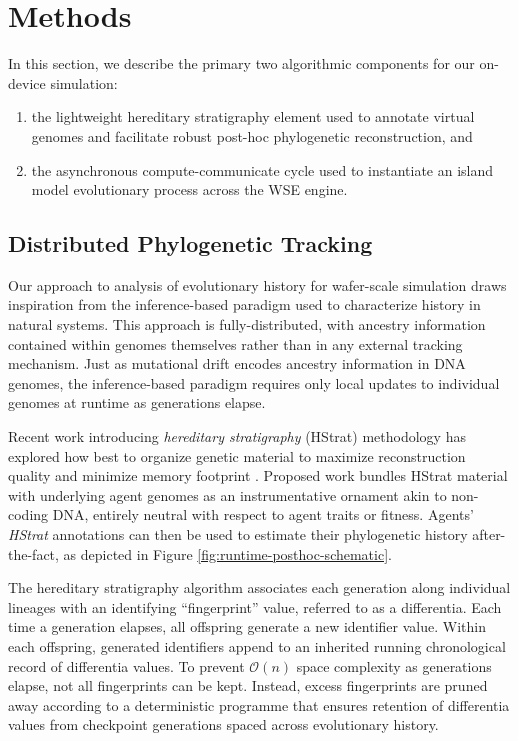 \section{Methods} \label{sec:methods}

In this section, we describe the primary two algorithmic components for our on-device simulation:
\begin{enumerate}
\item the lightweight hereditary stratigraphy element used to annotate virtual genomes and facilitate robust post-hoc phylogenetic reconstruction, and
\item the asynchronous compute-communicate cycle used to instantiate an island model evolutionary process across the WSE engine.
\end{enumerate}




\subsection{Distributed Phylogenetic Tracking}

Our approach to analysis of evolutionary history for wafer-scale simulation draws inspiration from the inference-based paradigm used to characterize history in natural systems.
This approach is fully-distributed, with ancestry information contained within genomes themselves rather than in any external tracking mechanism.
Just as mutational drift encodes ancestry information in DNA genomes, the inference-based paradigm requires only local updates to individual genomes at runtime as generations elapse.

Recent work introducing \textit{hereditary stratigraphy} (HStrat) methodology has explored how best to organize genetic material to maximize reconstruction quality and minimize memory footprint \citep{moreno2022hstrat, moreno2022hereditary}.
Proposed work bundles HStrat material with underlying agent genomes as an instrumentative ornament akin to non-coding DNA, entirely neutral with respect to agent traits or fitness.
Agents' \textit{HStrat} annotations can then be used to estimate their phylogenetic history after-the-fact, as depicted in Figure \ref{fig:runtime-posthoc-schematic}.

The hereditary stratigraphy algorithm associates each generation along individual lineages with an identifying ``fingerprint'' value, referred to as a differentia.
Each time a generation elapses, all offspring generate a new identifier value.
Within each offspring, generated identifiers append to an inherited running chronological record of differentia values.
To prevent $\mathcal{O}(n)$ space complexity as generations elapse, not all fingerprints can be kept.
Instead, excess fingerprints are pruned away according to a deterministic programme that ensures retention of differentia values from checkpoint generations spaced across evolutionary history.

